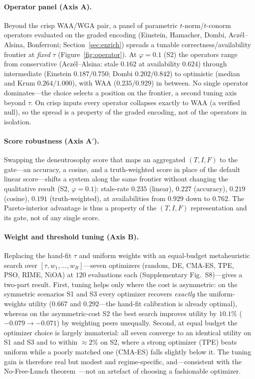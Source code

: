 \documentclass[fleqn,10pt]{wlscirep}
\begin{document}
\paragraph{Operator panel (Axis A).} Beyond the crisp WAA/WGA pair, a panel of parametric
$t$-norm/$t$-conorm operators evaluated on the graded encoding (Einstein, Hamacher, Dombi,
Acz\'el--Alsina, Bonferroni; Section~\ref{sec:enrich}) spreads a tunable correctness/availability
frontier at \emph{fixed} $\tau$ (Figure~\ref{fig:operator}). At $\varphi=0.1$ (S2) the operators range
from conservative (Acz\'el--Alsina: stale $0.162$ at availability $0.624$) through intermediate
(Einstein $0.187/0.750$; Dombi $0.202/0.842$) to optimistic (median and Krum $0.264/1.000$), with WAA
($0.235/0.929$) in between. No single operator dominates---the choice selects a position on the
frontier, a second tuning axis beyond $\tau$. On crisp inputs every operator collapses exactly to WAA (a
verified null), so the spread is a property of the graded encoding, not of the operators in isolation.

\paragraph{Score robustness (Axis A$'$).} Swapping the deneutrosophy score that maps an aggregated
$(T,I,F)$ to the gate---an accuracy, a cosine, and a truth-weighted score in place of the default
linear score---shifts a system along the same frontier without changing the qualitative result (S2,
$\varphi=0.1$): stale-rate $0.235$ (linear), $0.227$ (accuracy), $0.219$ (cosine), $0.191$
(truth-weighted), at availabilities from $0.929$ down to $0.762$. The Pareto-interior advantage is thus a
property of the $(T,I,F)$ representation and its gate, not of any single score.

\paragraph{Weight and threshold tuning (Axis B).} Replacing the hand-fit $\tau$ and uniform weights with
an equal-budget metaheuristic search over $[\tau, w_1,\dots,w_R]$---seven optimizers (random, DE, CMA-ES,
TPE, PSO, RIME, NiOA) at $120$ evaluations each (Supplementary Fig.~S8)---gives a two-part
result. First, tuning helps only where the cost is asymmetric: on the symmetric scenarios S1 and
S3 every optimizer recovers \emph{exactly} the uniform-weights utility ($0.667$ and $0.292$---the hand-fit
calibration is already optimal), whereas on the asymmetric-cost S2 the best search improves utility by
$10.1\%$ ($-0.079\to-0.071$) by weighting peers unequally. Second, at equal budget the optimizer choice is
largely immaterial: all seven converge to an identical utility on S1 and S3 and to within ${\approx}2\%$
on S2, where a strong optimizer (TPE) beats uniform while a poorly matched one (CMA-ES) falls
slightly below it. The tuning gain is therefore real but modest and regime-specific, and---consistent with
the No-Free-Lunch theorem~\cite{wolpert1997nfl}---not an artefact of choosing a fashionable optimizer.
\end{document}
